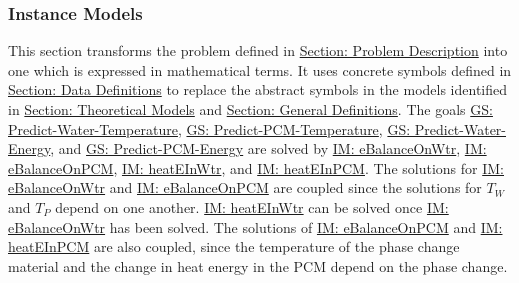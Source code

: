 \documentclass[12pt]{article}
\begin{document}
\subsubsection{Instance Models}
\label{Sec:IMs}
This section transforms the problem defined in \hyperref[Sec:ProbDesc]{Section: Problem Description} into one which is expressed in mathematical terms. It uses concrete symbols defined in \hyperref[Sec:DDs]{Section: Data Definitions} to replace the abstract symbols in the models identified in \hyperref[Sec:TMs]{Section: Theoretical Models} and \hyperref[Sec:GDs]{Section: General Definitions}.
The goals \hyperref[waterTempGS]{GS: Predict-Water-Temperature}, \hyperref[pcmTempGS]{GS: Predict-PCM-Temperature}, \hyperref[waterEnergyGS]{GS: Predict-Water-Energy}, and \hyperref[pcmEnergyGS]{GS: Predict-PCM-Energy} are solved by \hyperref[IM:eBalanceOnWtr]{IM: eBalanceOnWtr}, \hyperref[IM:eBalanceOnPCM]{IM: eBalanceOnPCM}, \hyperref[IM:heatEInWtr]{IM: heatEInWtr}, and \hyperref[IM:heatEInPCM]{IM: heatEInPCM}. The solutions for \hyperref[IM:eBalanceOnWtr]{IM: eBalanceOnWtr} and \hyperref[IM:eBalanceOnPCM]{IM: eBalanceOnPCM} are coupled since the solutions for ${T_{W}}$ and ${T_{P}}$ depend on one another. \hyperref[IM:heatEInWtr]{IM: heatEInWtr} can be solved once \hyperref[IM:eBalanceOnWtr]{IM: eBalanceOnWtr} has been solved. The solutions of \hyperref[IM:eBalanceOnPCM]{IM: eBalanceOnPCM} and \hyperref[IM:heatEInPCM]{IM: heatEInPCM} are also coupled, since the temperature of the phase change material and the change in heat energy in the PCM depend on the phase change.
\par~
\end{document}
